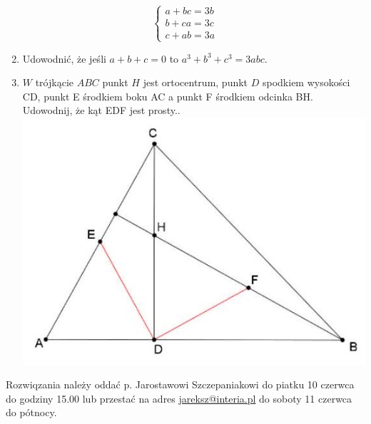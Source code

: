 \documentclass[10pt]{article}
\begin{document}
\[
\left\{\begin{array}{l}
a+b c=3 b \\
b+c a=3 c \\
c+a b=3 a
\end{array}\right.
\]

\begin{enumerate}
  \setcounter{enumi}{1}
  \item Udowodnić, że jeśli \(a+b+c=0\) to \(a^{3}+b^{3}+c^{3}=3 a b c\).
  \item \(W\) trójkącie \(A B C\) punkt \(H\) jest ortocentrum, punkt \(D\) spodkiem wysokości CD, punkt E środkiem boku AC a punkt F środkiem odcinka BH. Udowodnij, że kąt EDF jest prosty..\\
\includegraphics[max width=\textwidth, center]{2024_11_21_cb743ddb4cacb96e214dg-1}
\end{enumerate}

Rozwiqzania należy oddać p. Jarostawowi Szczepaniakowi do piatku 10 czerwca do godziny 15.00 lub przestać na adres \href{mailto:jareksz@interia.pl}{jareksz@interia.pl} do soboty 11 czerwca do pótnocy.
\end{document}
